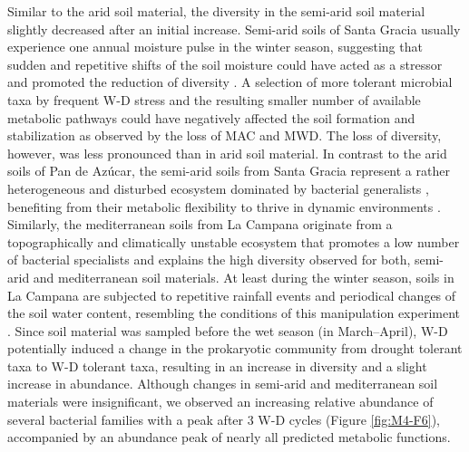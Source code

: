 Similar to the arid soil material, the diversity in the semi-arid soil material slightly decreased after an initial increase. Semi-arid soils of Santa Gracia usually experience one annual moisture pulse in the winter season, suggesting that sudden and repetitive shifts of the soil moisture could have acted as a stressor and promoted the reduction of diversity \citep{Clavel2011}. A selection of more tolerant microbial taxa by frequent W-D stress and the resulting smaller number of available metabolic pathways could have negatively affected the soil formation and stabilization \citep{Bestion2020, Shen2023} as observed by the loss of MAC and MWD. The loss of diversity, however, was less pronounced than in arid soil material. In contrast to the arid soils of Pan de Az{\'u}car, the semi-arid soils from Santa Gracia represent a rather heterogeneous and disturbed ecosystem dominated by bacterial generalists \citep{Rodriguez2022}, benefiting from their metabolic flexibility to thrive in dynamic environments \citep{Bai2021, ChenLeung2021, Hawkes2020}. Similarly, the mediterranean soils from La Campana originate from a topographically and climatically unstable ecosystem \citep{Rodriguez2022} that promotes a low number of bacterial specialists and explains the high diversity observed for both, semi-arid and mediterranean soil materials. At least during the winter season, soils in La Campana are subjected to repetitive rainfall events and periodical changes of the soil water content, resembling the conditions of this manipulation experiment \citep{Uebernickel2020}. Since soil material was sampled before the wet season (in March--April), W-D potentially induced a change in the prokaryotic community from drought tolerant taxa to W-D tolerant taxa, resulting in an increase in diversity and a slight increase in abundance. Although changes in semi-arid and mediterranean soil materials were insignificant, we observed an increasing relative abundance of several bacterial families with a peak after 3 W-D cycles (Figure \ref{fig:M4-F6}), accompanied by an abundance peak of nearly all predicted metabolic functions.

